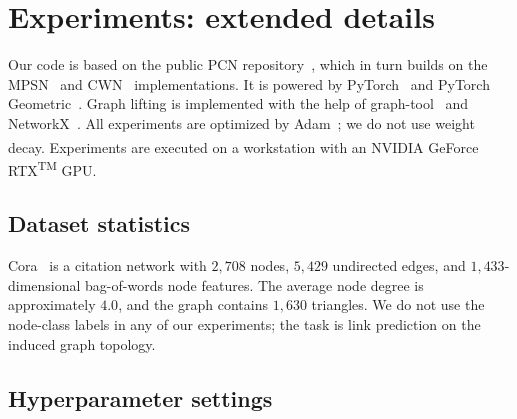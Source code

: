 \documentclass{article}
\begin{document}
\section{Experiments: extended details}
\label{app:experiments}
Our code is based on the public PCN repository~\citep{truong_weisfeiler_2024}, which in turn builds on the MPSN~\citep{bodnar_weisfeiler_2021} and CWN~\citep{bodnar_weisfeiler_2022} implementations. It is powered by PyTorch~\citep{paszke_pytorch_2019} and PyTorch Geometric~\citep{fey_fast_2019}. Graph lifting is implemented with the help of graph-tool~\citep{peixoto_graph-tool_2014} and NetworkX~\citep{hagberg_exploring_2008}. All experiments are optimized by Adam~\citep{kingma_adam_2015}; we do not use weight decay. Experiments are executed on a workstation with an NVIDIA\textsuperscript{\textregistered} GeForce\textsuperscript{\textregistered} RTX\textsuperscript{TM} GPU.

\subsection{Dataset statistics}
\label{app:data}
Cora~\citep{sen_collective_2008} is a citation network with $2{,}708$ nodes, $5{,}429$ undirected edges, and $1{,}433$-dimensional bag-of-words node features. The average node degree is approximately $4.0$, and the graph contains $1{,}630$ triangles. We do not use the node-class labels in any of our experiments; the task is link prediction on the induced graph topology.

\subsection{Hyperparameter settings}
\label{app:hparams}
\end{document}
